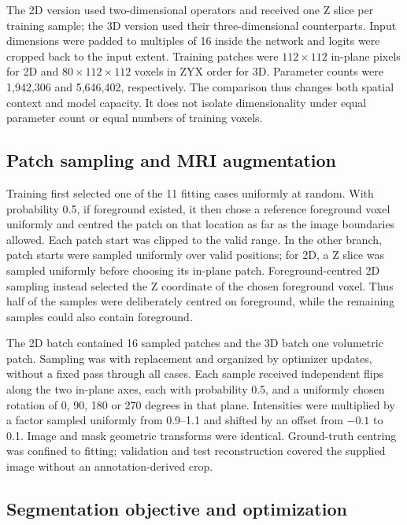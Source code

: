 \documentclass[11pt,a4paper]{article}
\begin{document}
The 2D version used two-dimensional operators and received one Z slice per training sample; the 3D version used their three-dimensional counterparts. Input dimensions were padded to multiples of 16 inside the network and logits were cropped back to the input extent. Training patches were $112\times112$ in-plane pixels for 2D and $80\times112\times112$ voxels in ZYX order for 3D. Parameter counts were 1,942,306 and 5,646,402, respectively. The comparison thus changes both spatial context and model capacity. It does not isolate dimensionality under equal parameter count or equal numbers of training voxels.



\subsection*{Patch sampling and MRI augmentation}

Training first selected one of the 11 fitting cases uniformly at random. With probability 0.5, if foreground existed, it then chose a reference foreground voxel uniformly and centred the patch on that location as far as the image boundaries allowed. Each patch start was clipped to the valid range. In the other branch, patch starts were sampled uniformly over valid positions; for 2D, a Z slice was sampled uniformly before choosing its in-plane patch. Foreground-centred 2D sampling instead selected the Z coordinate of the chosen foreground voxel. Thus half of the samples were deliberately centred on foreground, while the remaining samples could also contain foreground.



The 2D batch contained 16 sampled patches and the 3D batch one volumetric patch. Sampling was with replacement and organized by optimizer updates, without a fixed pass through all cases. Each sample received independent flips along the two in-plane axes, each with probability 0.5, and a uniformly chosen rotation of 0, 90, 180 or 270 degrees in that plane. Intensities were multiplied by a factor sampled uniformly from 0.9–1.1 and shifted by an offset from $-0.1$ to 0.1. Image and mask geometric transforms were identical. Ground-truth centring was confined to fitting; validation and test reconstruction covered the supplied image without an annotation-derived crop.



\subsection*{Segmentation objective and optimization}
\end{document}
